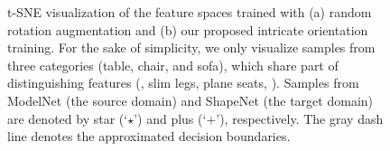 \begin{figure}[t]
    \centering
    \vspace{-2mm}
    \caption{t-SNE visualization of the feature spaces trained with (a) random rotation augmentation and (b) our proposed intricate orientation training. For the sake of simplicity, we only visualize samples from three categories (table, chair, and sofa), which share part of distinguishing features (\eg, slim legs, plane seats, \etc). Samples from ModelNet (the source domain) and ShapeNet (the target domain) are denoted by star (`$\star$') and plus (`$+$'), respectively. The gray dash line denotes the approximated decision boundaries.}
    \label{fig:feature_statement}
    \vspace{-5mm}
\end{figure}
